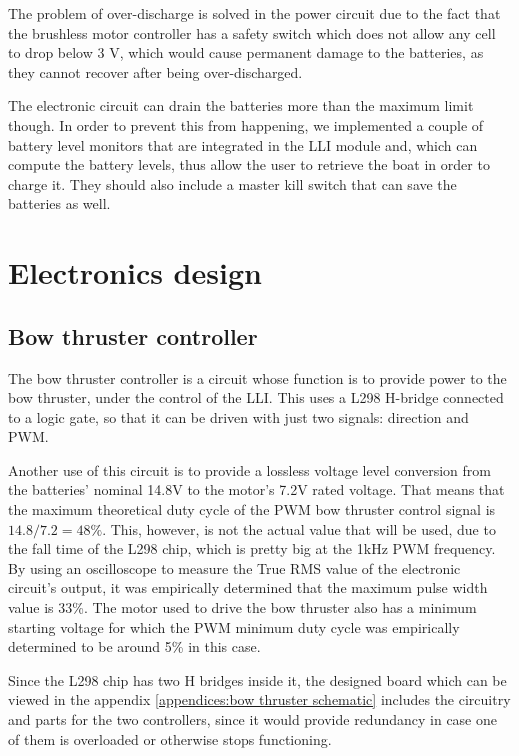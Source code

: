 	The problem of over-discharge is solved in the power circuit due to the fact that the brushless motor controller has a safety switch which does not allow any cell to drop below 3 V, which would cause permanent damage to the batteries, as they cannot recover after being over-discharged. 
	
	The electronic circuit can drain the batteries more than the maximum limit though. In order to prevent this from happening, we implemented a couple of battery level monitors that are integrated in the \ac{LLI} module and, which can compute the battery levels, thus allow the user to retrieve the boat in order to charge it. They should also include a master kill switch that can save the batteries as well.

\section{Electronics design}

	\subsection{Bow thruster controller}
	\label{subsec:bow thruster controller}
	
	The bow thruster controller is a circuit whose function is to provide power to the bow thruster, under the control of the \ac{LLI}. This uses a L298 H-bridge connected to a logic gate, so that it can be driven with just two signals: direction and \ac{PWM}.
	
	Another use of this circuit is to provide a lossless voltage level conversion from the batteries' nominal 14.8V to the motor's 7.2V rated voltage. That means that the maximum theoretical duty cycle of the PWM bow thruster control signal is $ 14.8 / 7.2 = 48 \% $. This, however, is not the actual value that will be used, due to the fall time of the L298 chip, which is pretty big at the 1kHz PWM frequency. By using an oscilloscope to measure the True RMS value of the electronic circuit's output, it was empirically determined that the maximum pulse width value is 33\%. 
	The motor used to drive the bow thruster also has a minimum starting voltage for which the PWM minimum duty cycle was empirically determined to be around 5\% in this case.
	
	Since the L298 chip has two H bridges inside it, the designed board which can be viewed in the appendix \vref{appendices:bow thruster schematic} includes the circuitry and parts for the two controllers, since it would provide redundancy in case one of them is overloaded or otherwise stops functioning.
	
